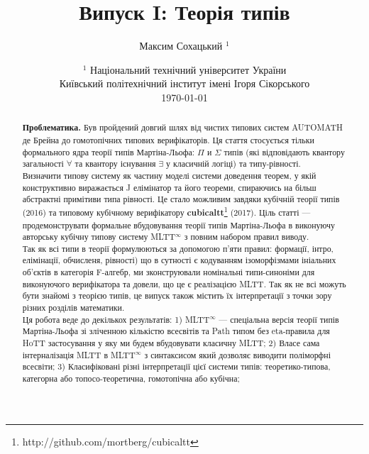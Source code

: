 \documentclass{article}
\theoremstyle{definition}
\begin{document}
\title{Випуск I: Теорія типів}
\author{Максим Сохацький $^1$}
\date{ $^1$ Національний технічний університет України \\
       \small Київський політехнічний інститут імені Ігоря Сікорського \\
       \today }

\maketitle

\begin{abstract}

{\bf Проблематика.}
Був пройдений довгий шлях від чистих типових систем AUTOMATH де Брейна до
гомотопічних типових верифікаторів. Ця стаття стосується тільки формального ядра
теорії типів Мартіна-Льофа: $\Pi$ и $\Sigma$ типів (які відповідають
квантору загальності $\forall$ та квантору існування $\exists$ у класичній логіці)
та типу-рівності.\\
Визначити типову систему як частину моделі системи доведення теорем,
у якій конструктивно виражається J елімінатор та його теореми, спираючись на більш абстрактні
примітиви типа рівності. Це стало можливим завдяки кубічній теорії типів (2016) та типовому кубічному верифікатору
{\bf cubicaltt}\footnote{http://github.com/mortberg/cubicaltt} (2017).
Ціль статті --- продемонструвати формальне вбудовування теорії типів Мартіна-Льофа
в виконуючу авторську кубічну типову систему MLTT$^{\infty}$ з повним набором правил виводу.\\
Так як всі типи в теорії формулюються за допомогою п'яти
правил: формації, інтро, елімінації, обчисленя, рівності) що в сутності
є кодуванням ізоморфізмами ініальних об'єктів в категорія F-алгебр, ми зконструювали
номінальні типи-синоніми для виконуючого верифікатора та довели, що це є реалізацією MLTT.
Так як не всі можуть бути знайомі з теорією типів,
це випуск також містить їх інтерпретації з точки зору різних розділів математики.\\
Ця робота веде до декількох результатів:
1) MLTT$^{\infty}$ --- спеціальна версія теорії типів Мартіна-Льофа зі зліченною кількістю всесвітів та Path типом без eta-правила для HoTT застосування у яку ми будем вбудовувати класичну MLTT;
2) Власе сама інтерналізація MLTT в MLTT$^{\infty}$ з синтаксисом який дозволяє виводити поліморфні всесвіти;
3) Класифіковані різні інтерпретації цієї системи типів: теоретико-типова, категорна або топосо-теоретична, гомотопічна або кубічна;

\end{abstract}
\end{document}
